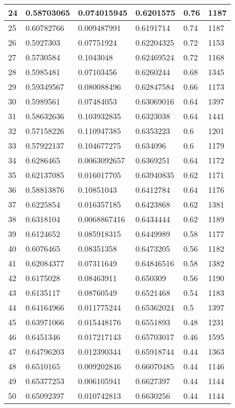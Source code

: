 \begin{longtable}{|l|l|l|l|l|l|}
24 & 0.58703065 & 0.074015945 & 0.6201575 & 0.76 & 1187 \\ \hline 
25 & 0.60782766 & 0.009487991 & 0.6191714 & 0.74 & 1187 \\ \hline 
26 & 0.5927303 & 0.07751924 & 0.62204325 & 0.72 & 1153 \\ \hline 
27 & 0.5730584 & 0.1043048 & 0.62469524 & 0.72 & 1168 \\ \hline 
28 & 0.5985481 & 0.07103456 & 0.6260244 & 0.68 & 1345 \\ \hline 
29 & 0.59349567 & 0.080088496 & 0.62847584 & 0.66 & 1173 \\ \hline 
30 & 0.5989561 & 0.07484053 & 0.63069016 & 0.64 & 1397 \\ \hline 
31 & 0.58632636 & 0.103932835 & 0.6323038 & 0.64 & 1441 \\ \hline 
32 & 0.57158226 & 0.110947385 & 0.6353223 & 0.6 & 1201 \\ \hline 
33 & 0.57922137 & 0.104677275 & 0.634096 & 0.6 & 1179 \\ \hline 
34 & 0.6286465 & 0.0063092657 & 0.6369251 & 0.64 & 1172 \\ \hline 
35 & 0.62137085 & 0.016017705 & 0.63940835 & 0.62 & 1171 \\ \hline 
36 & 0.58813876 & 0.10851043 & 0.6412784 & 0.64 & 1176 \\ \hline 
37 & 0.6225854 & 0.016357185 & 0.6423868 & 0.62 & 1381 \\ \hline 
38 & 0.6318104 & 0.0068867416 & 0.6434444 & 0.62 & 1189 \\ \hline 
39 & 0.6124652 & 0.085918315 & 0.6449989 & 0.58 & 1177 \\ \hline 
40 & 0.6076465 & 0.08351358 & 0.6473205 & 0.56 & 1182 \\ \hline 
41 & 0.62084377 & 0.07311649 & 0.64846516 & 0.58 & 1382 \\ \hline 
42 & 0.6175028 & 0.08463911 & 0.650309 & 0.56 & 1190 \\ \hline 
43 & 0.6135117 & 0.08760549 & 0.6521468 & 0.54 & 1183 \\ \hline 
44 & 0.64164966 & 0.011775244 & 0.65362024 & 0.5 & 1397 \\ \hline 
45 & 0.63971066 & 0.015448176 & 0.6551893 & 0.48 & 1231 \\ \hline 
46 & 0.6451346 & 0.017217143 & 0.65703017 & 0.46 & 1595 \\ \hline 
47 & 0.64796203 & 0.012390344 & 0.65918744 & 0.44 & 1363 \\ \hline 
48 & 0.6510165 & 0.009202846 & 0.66070485 & 0.44 & 1146 \\ \hline 
49 & 0.65377253 & 0.006105941 & 0.6627397 & 0.44 & 1144 \\ \hline 
50 & 0.65092397 & 0.010742813 & 0.6630256 & 0.44 & 1144 \\ \hline 
\end{longtable}